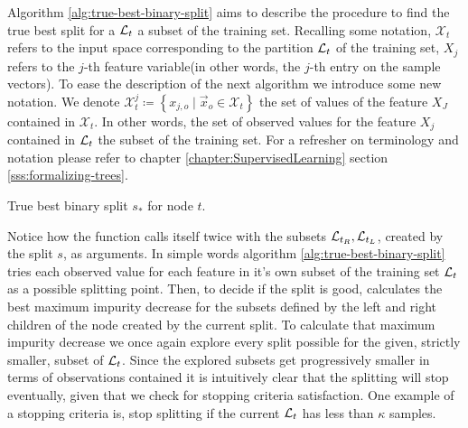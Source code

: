 Algorithm \ref{alg:true-best-binary-split} aims to describe the procedure to
find the true best split for a $\mathcal{L}_t$ a subset of the training set. Recalling
some notation, $\mathcal{X}_t$ refers to the input space corresponding to the
partition $\mathcal{L}_t$ of the training set, $X_j$ refers to the $j$-th feature
variable(in other words, the $j$-th entry on the sample vectors). To ease the
description of the next algorithm we introduce some new notation. We denote
$\mathcal{X}_{t}^{j} \coloneqq \left\{ x_{j, o} \mid \vec{x}_{o} \in
\mathcal{X}_t \right\}$ the set of values of the feature $X_J$ contained in
$\mathcal{X}_t$. In other words, the set of observed values for the feature
$X_j$ contained in $\mathcal{L}_t$ the subset of the training set. For a refresher on
terminology and notation please refer to chapter
\ref{chapter:SupervisedLearning} section \ref{sss:formalizing-trees}.

\begin{algorithm}
    \caption[True best binary split for node $t$.]{True best binary split $s_*$ for node $t$.}
    \label{alg:true-best-binary-split}
\end{algorithm}

Notice how the function \TrueBestSplit calls itself twice with the subsets
$\mathcal{L}_{t_R}, \mathcal{L}_{t_L}$, created by the split $s$, as arguments. In simple words
algorithm \ref{alg:true-best-binary-split} tries each observed value for each
feature in it's own subset of the training set $\mathcal{L}_t$ as a possible splitting
point. Then, to decide if the split is good, calculates the best maximum
impurity decrease for the subsets defined by the left and right children of the
node created by the current split. To calculate that maximum impurity decrease
we once again explore every split possible for the given, strictly smaller,
subset of $\mathcal{L}_t$. Since the explored subsets get progressively smaller in terms
of observations contained it is intuitively clear that the splitting will stop
eventually, given that we check for stopping criteria satisfaction. One example
of a stopping criteria is, stop splitting if the current $\mathcal{L}_t$ has less
than $\kappa$ samples.

